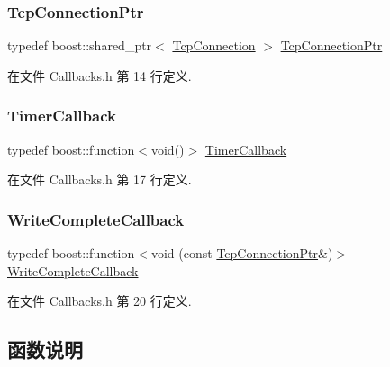 \mbox{\label{namespacemuduo_a40c45128e9700d337d92f3cbb8dd4a0a}} 
\subsubsection{\texorpdfstring{Tcp\+Connection\+Ptr}{TcpConnectionPtr}}
{\footnotesize\ttfamily typedef boost\+::shared\+\_\+ptr$<$ \hyperlink{classmuduo_1_1TcpConnection}{Tcp\+Connection} $>$ \hyperlink{namespacemuduo_a40c45128e9700d337d92f3cbb8dd4a0a}{Tcp\+Connection\+Ptr}}



在文件 Callbacks.\+h 第 14 行定义.

\mbox{\label{namespacemuduo_a5f7453c2a15825e79bddf5deaec707bf}} 
\subsubsection{\texorpdfstring{Timer\+Callback}{TimerCallback}}
{\footnotesize\ttfamily typedef boost\+::function$<$void()$>$ \hyperlink{namespacemuduo_a5f7453c2a15825e79bddf5deaec707bf}{Timer\+Callback}}



在文件 Callbacks.\+h 第 17 行定义.

\mbox{\label{namespacemuduo_a605eda27d048a69607942b95735d7087}} 
\subsubsection{\texorpdfstring{Write\+Complete\+Callback}{WriteCompleteCallback}}
{\footnotesize\ttfamily typedef boost\+::function$<$void (const \hyperlink{namespacemuduo_a40c45128e9700d337d92f3cbb8dd4a0a}{Tcp\+Connection\+Ptr}\&)$>$ \hyperlink{namespacemuduo_a605eda27d048a69607942b95735d7087}{Write\+Complete\+Callback}}



在文件 Callbacks.\+h 第 20 行定义.



\subsection{函数说明}
\mbox{\label{namespacemuduo_a4c4a0e85f7b5c4056878cd7cf26a83cb}} 
